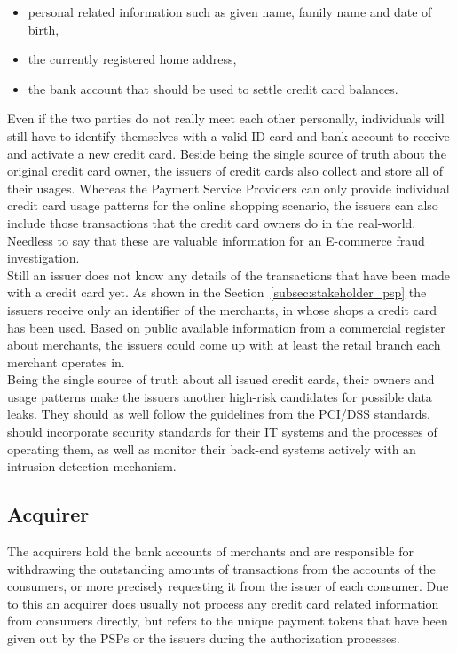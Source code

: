\begin{itemize}
		\item personal related information such as given name, family name and date of birth,
		\item the currently registered home address,
		\item the bank account that should be used to settle credit card balances.
\end{itemize}

Even if the two parties do not really meet each other personally, individuals will still have to identify themselves with a valid ID card and bank account to receive and activate a new credit card. Beside being the single source of truth about the original credit card owner, the issuers of credit cards also collect and store all of their usages. Whereas the Payment Service Providers can only provide individual credit card usage patterns for the online shopping scenario, the issuers can also include those transactions that the credit card owners do in the real-world. Needless to say that these are valuable information for an \gls{E-commerce} fraud investigation. \\

Still an issuer does not know any details of the transactions that have been made with a credit card yet. As shown in the Section~\ref{subsec:stakeholder_psp} the issuers receive only an identifier of the merchants, in whose shops a credit card has been used. Based on public available information from a commercial register about merchants, the issuers could come up with at least the retail branch each merchant operates in. \\

Being the single source of truth about all issued credit cards, their owners and usage patterns make the issuers another high-risk candidates for possible data leaks. They should as well follow the guidelines from the \gls{PCI/DSS} standards, should incorporate security standards for their \gls{IT} systems and the processes of operating them, as well as monitor their back-end systems actively with an intrusion detection mechanism.


\subsection{Acquirer}
\label{subsec:stakeholder_acquirer}

The acquirers hold the bank accounts of merchants and are responsible for withdrawing the outstanding amounts of transactions from the accounts of the consumers, or more precisely requesting it from the issuer of each consumer. Due to this an acquirer does usually not process any credit card related information from consumers directly, but refers to the unique payment tokens that have been given out by the \gls{PSP}s or the issuers during the authorization processes. \\

